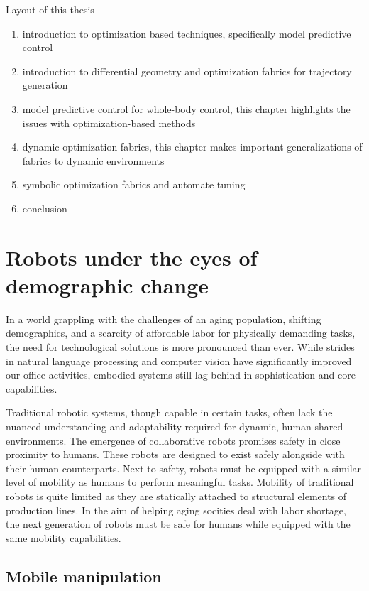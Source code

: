 Layout of this thesis
\begin{enumerate}
  \item introduction to optimization based techniques, specifically model
  predictive control
  \item introduction to differential geometry and optimization fabrics for
  trajectory generation
  \item model predictive control for whole-body control, this chapter highlights
  the issues with optimization-based methods
  \item dynamic optimization fabrics, this chapter makes important
  generalizations of fabrics to dynamic environments  
  \item symbolic optimization fabrics and automate tuning
  \item conclusion
\end{enumerate}
\fi

\section{Robots under the eyes of demographic change}

In a world grappling with the challenges of an aging
population, shifting demographics, and a scarcity of
affordable labor for physically demanding tasks, the need
for technological solutions is more pronounced than ever.
While strides in natural language processing and computer
vision have significantly improved our office activities,
embodied systems still lag behind in sophistication and core
capabilities.

Traditional robotic systems, though capable in certain
tasks, often lack the nuanced understanding and adaptability
required for dynamic, human-shared environments. The
emergence of collaborative robots promises safety in close
proximity to humans. These robots are designed to exist
safely alongside with their human counterparts. Next to
safety, robots must be equipped with a similar level of
mobility as humans to perform meaningful tasks. Mobility of
traditional robots is quite limited as they are statically
attached to structural elements of production lines. In the
aim of helping aging socities deal with labor shortage,
the next generation of robots must be safe for humans while
equipped with the same mobility capabilities.

\subsection{Mobile manipulation}

